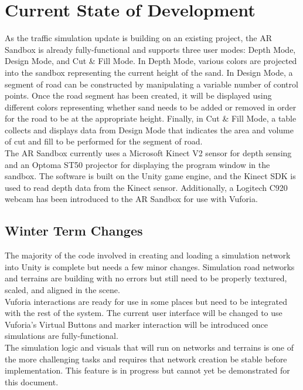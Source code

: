 \documentclass[letterpaper, 10pt, onecolumn, draftclsnofoot]{IEEEtran}
\begin{document}
\section{Current State of Development}
    As the traffic simulation update is building on an existing project, the AR Sandbox is already fully-functional and supports three user modes: Depth Mode, Design Mode, and Cut \& Fill Mode. In Depth Mode, various colors are projected into the sandbox representing the current height of the sand. In Design Mode, a segment of road can be constructed by manipulating a variable number of control points.\cite{OrgOSUSandbox} Once the road segment has been created, it will be displayed using different colors representing whether sand needs to be added or removed in order for the road to be at the appropriate height. Finally, in Cut \& Fill Mode, a table collects and displays data from Design Mode that indicates the area and volume of cut and fill to be performed for the segment of road. \\
    
    The AR Sandbox currently uses a Microsoft Kinect V2 sensor for depth sensing and an Optoma ST50 projector for displaying the program window in the sandbox. The software is built on the Unity game engine, and the Kinect SDK is used to read depth data from the Kinect sensor. Additionally, a Logitech C920 webcam has been introduced to the AR Sandbox for use with Vuforia.
    
    \subsection{Winter Term Changes}
        The majority of the code involved in creating and loading a simulation network into Unity is complete but needs a few minor changes. Simulation road networks and terrains are building with no errors but still need to be properly textured, scaled, and aligned in the scene.\\
        
        Vuforia interactions are ready for use in some places but need to be integrated with the rest of the system. The current user interface will be changed to use Vuforia's Virtual Buttons and marker interaction will be introduced once simulations are fully-functional.\\
        
        The simulation logic and visuals that will run on networks and terrains is one of the more challenging tasks and requires that network creation be stable before implementation. This feature is in progress but cannot yet be demonstrated for this document.\\
        
\end{document}
